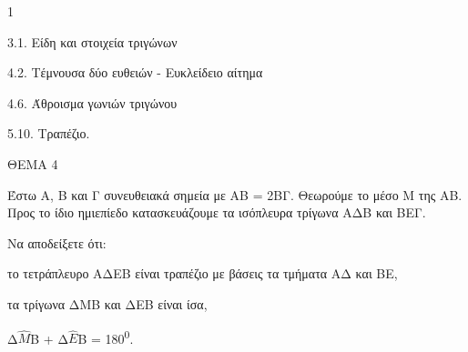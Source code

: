 \begin{ylh}{1}
    \item 3.1. Είδη και στοιχεία τριγώνων
    \item 4.2. Τέμνουσα δύο ευθειών - Ευκλείδειο αίτημα
    \item 4.6. Άθροισμα γωνιών τριγώνου
    \item 5.10. Τραπέζιο.
\end{ylh}

ΘΕΜΑ 4

Έστω Α, Β και Γ συνευθειακά σημεία με ΑΒ = 2ΒΓ. Θεωρούμε το μέσο Μ της ΑΒ. Προς το ίδιο ημιεπίεδο κατασκευάζουμε τα ισόπλευρα τρίγωνα ΑΔΒ και ΒΕΓ.

Να αποδείξετε ότι:

\begin{alist}
\item το τετράπλευρο ΑΔΕΒ είναι τραπέζιο με βάσεις τα τμήματα ΑΔ και ΒΕ, 

\item τα τρίγωνα ΔΜΒ και ΔΕΒ είναι ίσα, 

\item Δ$\widehat{Μ}$Β + Δ$\widehat{Ε}$Β = 180\textsuperscript{0}. 


\begin{center}
\end{center}
\end{alist}
